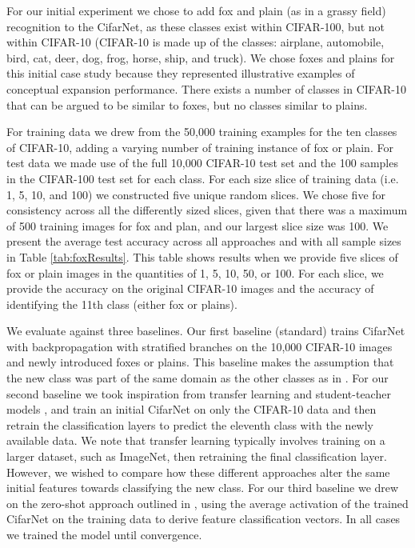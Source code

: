 \documentclass[letterpaper]{article}
\begin{document}
For our initial experiment we chose to add fox and plain (as in a grassy field) recognition to the CifarNet, as these classes exist within CIFAR-100, but not within CIFAR-10 
(CIFAR-10 is made up of the classes: airplane, automobile, bird, cat, deer, dog, frog, horse, ship, and truck).
We chose foxes and plains for this initial case study because they represented illustrative examples of conceptual expansion performance. 
There exists a number of classes in CIFAR-10 that can be argued to be similar to foxes, but no classes similar to plains.

For training data we drew from the 50,000 training examples for the ten classes of CIFAR-10, adding a varying number of training instance of fox or plain. 
For test data we made use of the full 10,000 CIFAR-10 test set and the 100 samples in the CIFAR-100 test set for each class. 
For each size slice of training data (i.e. 1, 5, 10, and 100) we constructed five unique random slices. 
We chose five for consistency across all the differently sized slices, given that there was a maximum of 500 training images for fox and plan, and our largest slice size was 100.
We present the average test accuracy across all approaches and with all sample sizes in Table \ref{tab:foxResults}. 
This table shows results when we provide five slices of fox or plain images in the quantities of 1, 5, 10, 50, or 100. 
For each slice, we provide the accuracy on the original CIFAR-10 images and the accuracy of identifying the 11th class (either fox or plains).

We evaluate against three baselines. 
Our first baseline (standard) trains CifarNet with backpropagation with stratified branches on the 10,000 CIFAR-10 images and newly introduced foxes or plains.
This baseline makes the assumption that the new class was part of the same domain as the other classes as in \cite{daume2009frustratingly}. 
For our second baseline we took inspiration from transfer learning and student-teacher models \cite{wong2016sequence,li2017large,furlanello2017born}, and train an initial CifarNet on only the CIFAR-10 data and then retrain the classification layers to predict the eleventh class with the newly available data. 
We note that transfer learning typically involves training on a larger dataset, such as ImageNet, then retraining the final classification layer. 
However, we wished to compare how these different approaches alter the same initial features towards classifying the new class. 
For our third baseline we drew on the zero-shot approach outlined in \cite{chao2016empirical}, using the average activation of the trained CifarNet on the training data to derive feature classification vectors. 
In all cases we trained the model until convergence. 
\end{document}
